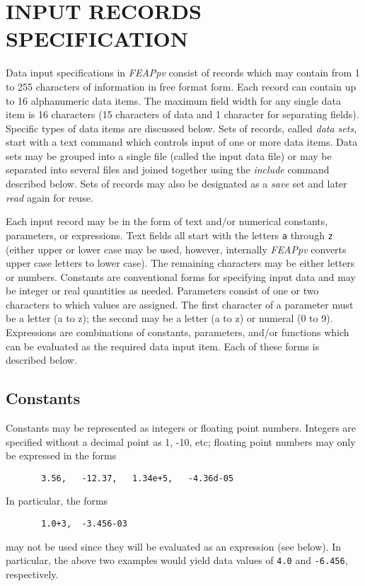 \chapter[Input Records]{INPUT RECORDS SPECIFICATION}
\label{record}

Data input specifications in {\sl FEAPpv} consist of records which may contain
from 1 to 255 characters of information in free format form.
Each record can contain up to 16 alphanumeric data items.  The maximum
field width for any single data item is 16 characters (15 characters of
data and 1 character for separating fields).  Specific types of data items
are discussed below.  Sets of records, called {\it data sets},
start with a text command which controls input of one or more 
data items.  Data sets may be grouped into a single file (called the input
data file) or may be separated into several files and joined together
using the {\it include} command described below.  Sets of records may also
be designated as a {\it save} set and later {\it read} again for reuse.

Each input record may be in the form of text and/or numerical
constants, parameters, or expressions.  Text fields all start with the 
letters {\tt a} through {\tt z} (either upper or lower case may be
used, however, internally {\sl FEAPpv} converts upper case letters to lower case).
The remaining characters may be either letters or numbers.
Constants are conventional
forms for specifying input data and may be integer or real
quantities as needed.  Parameters consist of one or two characters to
which values are assigned.  The first character of a parameter must be
a letter (a to z); the second may be a letter (a to z) or numeral (0 to 9).
Expressions are combinations of
constants, parameters, and/or functions which can be evaluated as the
required data input item.  Each of these forms is described below.

\section{Constants}

Constants may be represented as integers or floating point numbers.
Integers are specified without a decimal point as 1, -10, etc;
floating point numbers may only be expressed in the forms
\begin{verbatim}
       3.56,   -12.37,   1.34e+5,   -4.36d-05
\end{verbatim}
In particular, the forms
\begin{verbatim}
       1.0+3,  -3.456-03
\end{verbatim}
may not be used since they will be evaluated as an expression (see
below).  In particular, the above two examples would yield data values
of {\tt 4.0} and {\tt -6.456}, respectively.

